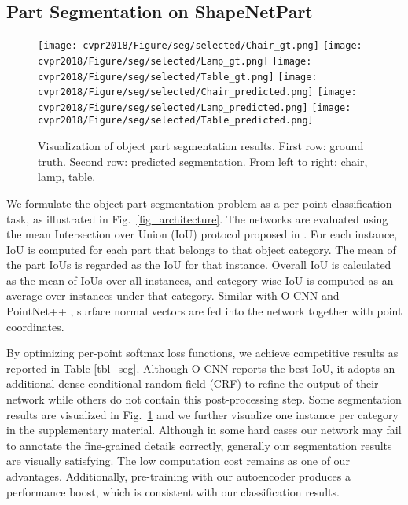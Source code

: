 \documentclass[10pt,twocolumn,letterpaper]{article}
\begin{document}
\subsection{Part Segmentation on ShapeNetPart} \label{sec_exp_seg}
\begin{figure}[h] 
        \centering
        \texttt{[image: cvpr2018/Figure/seg/selected/Chair\_gt.png]}
        \texttt{[image: cvpr2018/Figure/seg/selected/Lamp\_gt.png]}
        \texttt{[image: cvpr2018/Figure/seg/selected/Table\_gt.png]}
        \texttt{[image: cvpr2018/Figure/seg/selected/Chair\_predicted.png]}
        \texttt{[image: cvpr2018/Figure/seg/selected/Lamp\_predicted.png]}
        \texttt{[image: cvpr2018/Figure/seg/selected/Table\_predicted.png]}
        \caption{Visualization of object part segmentation results. First row: ground truth. Second row: predicted segmentation. From left to right: chair, lamp, table. }
        \label{fig_seg_selected}
        \vspace{-4pt}
\end{figure}
We formulate the object part segmentation problem as a per-point classification task, as illustrated in Fig.~\ref{fig_architecture}. The networks are evaluated using the mean Intersection over Union (IoU) protocol proposed in \cite{qi2016pointnet}. For each instance, IoU is computed for each part that belongs to that object category. The mean of the part IoUs is regarded as the IoU for that instance. Overall IoU is calculated as the mean of IoUs over all instances, and category-wise IoU is computed as an average over instances under that category. Similar with O-CNN \cite{wang2017cnn} and PointNet++ \cite{qi2017pointnet++}, surface normal vectors are fed into the network together with point coordinates.

By optimizing per-point softmax loss functions, we achieve competitive results as reported in Table \ref{tbl_seg}. Although O-CNN reports the best IoU, it adopts an additional dense conditional random field (CRF) to refine the output of their network while others do not contain this post-processing step. Some segmentation results are visualized in Fig.~\ref{fig_seg_selected} and we further visualize one instance per category in the supplementary material. Although in some hard cases our network may fail to annotate the fine-grained details correctly, generally our segmentation results are visually satisfying. The low computation cost remains as one of our advantages. Additionally, pre-training with our autoencoder produces a performance boost, which is consistent with our classification results.
\end{document}
